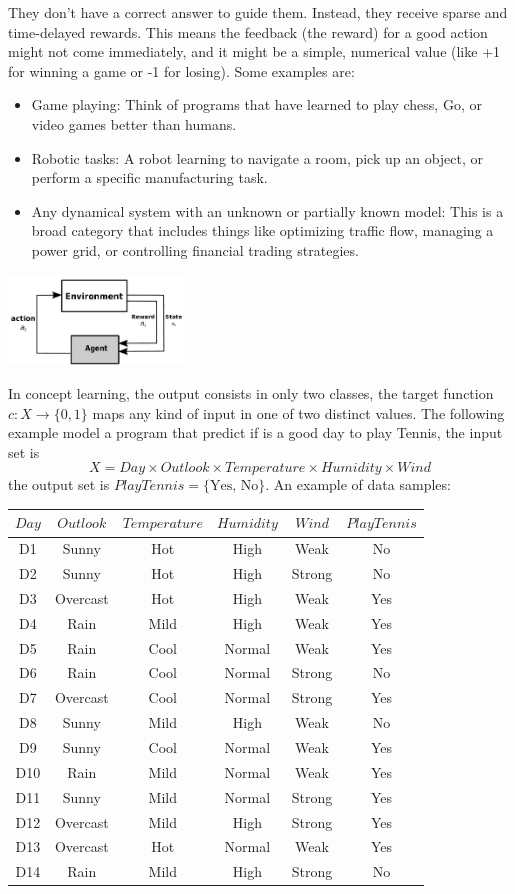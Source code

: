 \documentclass[10pt, letterpaper]{report}
\begin{document}
They don't have a correct answer to guide them. Instead, they receive sparse and time-delayed rewards. This means the feedback (the reward) for a good action might not come immediately, and it might be a simple, numerical value (like +1 for winning a game or -1 for losing). Some examples are:\begin{itemize}
    \item Game playing: Think of programs that have learned to play chess, Go, or video games better than humans.
    \item Robotic tasks: A robot learning to navigate a room, pick up an object, or perform a specific manufacturing task.
    \item Any dynamical system with an unknown or partially known model: This is a broad category that includes things like optimizing traffic flow, managing a power grid, or controlling financial trading strategies.
\end{itemize}
\begin{center}
     \includegraphics[width=0.35\textwidth]{images/RL_diagram.png}
\end{center}
In concept learning, the output consists in only two classes, the target function $c:X\rightarrow\{0,1\}$ maps  any kind of input in one of two distinct values. The following example model a program that predict if is a good day to play Tennis, the input set is $$ 
X=Day\times Outlook \times Temperature \times Humidity \times Wind 
$$
the output set is $PlayTennis=\{\text{Yes, No}\}$. An example of data samples:\begin{center}
\begin{tabular}{cccccc}
\toprule
$Day$ & $Outlook$ & $Temperature$ & $Humidity$ & $Wind$ & $PlayTennis$ \\
\midrule
D1 & Sunny & Hot & High & Weak & No \\
D2 & Sunny & Hot & High & Strong & No \\
D3 & Overcast & Hot & High & Weak & Yes \\
D4 & Rain & Mild & High & Weak & Yes \\
D5 & Rain & Cool & Normal & Weak & Yes \\
D6 & Rain & Cool & Normal & Strong & No \\
D7 & Overcast & Cool & Normal & Strong & Yes \\
D8 & Sunny & Mild & High & Weak & No \\
D9 & Sunny & Cool & Normal & Weak & Yes \\
D10 & Rain & Mild & Normal & Weak & Yes \\
D11 & Sunny & Mild & Normal & Strong & Yes \\
D12 & Overcast & Mild & High & Strong & Yes \\
D13 & Overcast & Hot & Normal & Weak & Yes \\
D14 & Rain & Mild & High & Strong & No \\
\bottomrule
\end{tabular}
\end{center}
\end{document}
